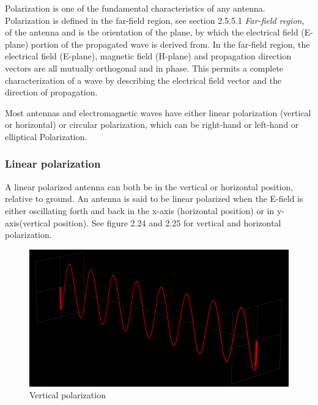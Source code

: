 Polarization is one of the fundamental characteristics of any antenna. Polarization is defined in the far-field region, see section 2.5.5.1 \textit{Far-field region}, of the antenna and is the orientation of the plane, by which the electrical field (E-plane) portion of the propagated wave is derived from. In the far-field region, the electrical field (E-plane), magnetic field (H-plane) and propagation direction vectors are all mutually orthogonal and in phase. This permits a complete characterization of a wave by describing the electrical field vector and the direction of propagation.

Most antennas and electromagnetic waves have either linear polarization (vertical or horizontal) or circular polarization, which can be right-hand or left-hand or elliptical Polarization. 

\subsubsection{Linear polarization}
A linear polarized antenna can both be in the vertical or horizontal position, relative to ground. An antenna is said to be linear polarized when the E-field is either oscillating forth and back in the x-axis (horizontal position) or in y-axis(vertical position). See figure 2.24 and 2.25 for vertical and horizontal polarization. 

\begin{figure}[h]
\centering
\includegraphics[scale=0.25]{figures/VerticalPolarization.PNG}
\caption{Vertical polarization}
\end{figure}


